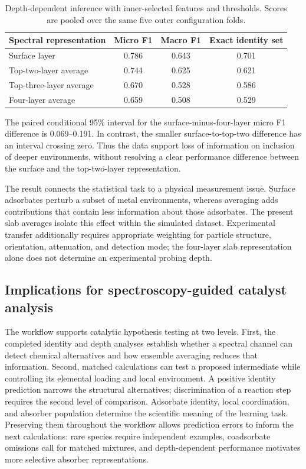 \documentclass[11pt,a4paper]{article}
\begin{document}
\begin{table}[!htbp]\centering\small
\caption{Depth-dependent inference with inner-selected features and thresholds. Scores are pooled over the same five outer configuration folds.}\label{tab:performance}
\begin{tabular}{@{}lccc@{}}\toprule
Spectral representation & Micro F1 & Macro F1 & Exact identity set\\\midrule
Surface layer &0.786&0.643&0.701\\
Top-two-layer average &0.744&0.625&0.621\\
Top-three-layer average &0.670&0.528&0.586\\
Four-layer average &0.659&0.508&0.529\\\bottomrule
\end{tabular}
\end{table}

The paired conditional 95\% interval for the surface-minus-four-layer micro F1 difference is 0.069--0.191. In contrast, the smaller surface-to-top-two difference has an interval crossing zero. Thus the data support loss of information on inclusion of deeper environments, without resolving a clear performance difference between the surface and the top-two-layer representation.

The result connects the statistical task to a physical measurement issue. Surface adsorbates perturb a subset of metal environments, whereas averaging adds contributions that contain less information about those adsorbates. The present slab averages isolate this effect within the simulated dataset. Experimental transfer additionally requires appropriate weighting for particle structure, orientation, attenuation, and detection mode; the four-layer slab representation alone does not determine an experimental probing depth.

\subsection{Implications for spectroscopy-guided catalyst analysis}
The workflow supports catalytic hypothesis testing at two levels. First, the completed identity and depth analyses establish whether a spectral channel can detect chemical alternatives and how ensemble averaging reduces that information. Second, matched calculations can test a proposed intermediate while controlling its elemental loading and local environment. A positive identity prediction narrows the structural alternatives; discrimination of a reaction step requires the second level of comparison. Adsorbate identity, local coordination, and absorber population determine the scientific meaning of the learning task. Preserving them throughout the workflow allows prediction errors to inform the next calculations: rare species require independent examples, coadsorbate omissions call for matched mixtures, and depth-dependent performance motivates more selective absorber representations.
\end{document}
